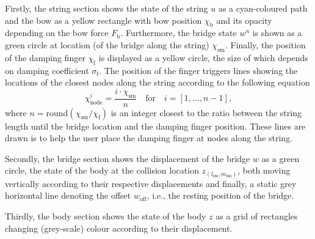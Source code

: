 \documentclass[dvipsnames, pdftex]{article}
\def\stringx{\chi}
\def\us{u}
\def\um{w}
\def\up{z}
\begin{document}
Firstly, the string section shows the state of the string $\us$ as a cyan-coloured path and the bow as a yellow rectangle with bow position $\stringx_\text{b}$ and its opacity depending on the bow force $F_\text{b}$. Furthermore, the bridge state $\um^n$ is shown as a green circle at location (of the bridge along the string) $\stringx_\text{sm}$. Finally, the position of the damping finger $\stringx_\text{f}$ is displayed as a yellow circle, the size of which depends on damping coefficient $\sigma_\text{f}$. The position of the finger triggers lines showing the locations of the closest nodes along the string according to the following equation
\begin{equation}\label{eq:node}
    \stringx_\text{node}^i = \frac{i\cdot \stringx_\text{sm}}{n}\quad \text{for} \quad i = [1,\hdots,n-1],
\end{equation}
where $n = \text{round} (\stringx_\text{sm}/\stringx_\text{f})$ is an integer closest to the ratio between the string length until the bridge location and the damping finger position. These lines are drawn is to help the user place the damping finger at nodes along the string.

Secondly, the bridge section shows the displacement of the bridge $\um$ as a green circle, the state of the body at the collision location $\up_{(l_\text{sm},m_\text{sm})}$, both moving vertically according to their respective displacements and finally, a static grey horizontal line denoting the offset $\um_\text{off}$, i.e., the resting position of the bridge.

Thirdly, the body section shows the state of the body $\up$ as a grid of rectangles changing (grey-scale) colour according to their displacement.
\end{document}
